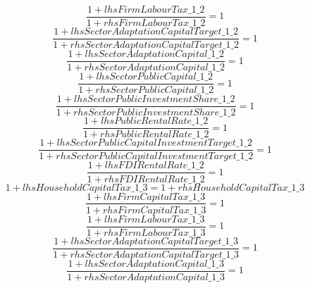 \begin{dmath}
\frac{1+{lhsFirmLabourTax\_1\_2}}{1+{rhsFirmLabourTax\_1\_2}}=1
\end{dmath}
\begin{dmath}
\frac{1+{lhsSectorAdaptationCapitalTarget\_1\_2}}{1+{rhsSectorAdaptationCapitalTarget\_1\_2}}=1
\end{dmath}
\begin{dmath}
\frac{1+{lhsSectorAdaptationCapital\_1\_2}}{1+{rhsSectorAdaptationCapital\_1\_2}}=1
\end{dmath}
\begin{dmath}
\frac{1+{lhsSectorPublicCapital\_1\_2}}{1+{rhsSectorPublicCapital\_1\_2}}=1
\end{dmath}
\begin{dmath}
\frac{1+{lhsSectorPublicInvestmentShare\_1\_2}}{1+{rhsSectorPublicInvestmentShare\_1\_2}}=1
\end{dmath}
\begin{dmath}
\frac{1+{lhsPublicRentalRate\_1\_2}}{1+{rhsPublicRentalRate\_1\_2}}=1
\end{dmath}
\begin{dmath}
\frac{1+{lhsSectorPublicCapitalInvestmentTarget\_1\_2}}{1+{rhsSectorPublicCapitalInvestmentTarget\_1\_2}}=1
\end{dmath}
\begin{dmath}
\frac{1+{lhsFDIRentalRate\_1\_2}}{1+{rhsFDIRentalRate\_1\_2}}=1
\end{dmath}
\begin{dmath}
1+{lhsHouseholdCapitalTax\_1\_3}=1+{rhsHouseholdCapitalTax\_1\_3}
\end{dmath}
\begin{dmath}
\frac{1+{lhsFirmCapitalTax\_1\_3}}{1+{rhsFirmCapitalTax\_1\_3}}=1
\end{dmath}
\begin{dmath}
\frac{1+{lhsFirmLabourTax\_1\_3}}{1+{rhsFirmLabourTax\_1\_3}}=1
\end{dmath}
\begin{dmath}
\frac{1+{lhsSectorAdaptationCapitalTarget\_1\_3}}{1+{rhsSectorAdaptationCapitalTarget\_1\_3}}=1
\end{dmath}
\begin{dmath}
\frac{1+{lhsSectorAdaptationCapital\_1\_3}}{1+{rhsSectorAdaptationCapital\_1\_3}}=1
\end{dmath}
